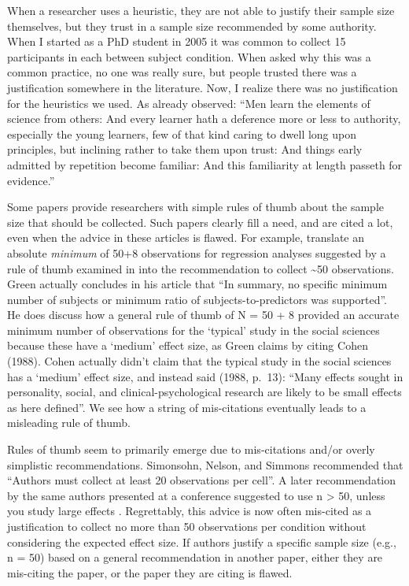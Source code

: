 \documentclass[
  oneside]{book}
\begin{document}
When a researcher uses a heuristic, they are not able to justify their sample size themselves, but they trust in a sample size recommended by some authority. When I started as a PhD student in 2005 it was common to collect 15 participants in each between subject condition. When asked why this was a common practice, no one was really sure, but people trusted there was a justification somewhere in the literature. Now, I realize there was no justification for the heuristics we used. As \citet{berkeley_defence_1735} already observed: ``Men learn the elements of science from others: And every learner hath a deference more or less to authority, especially the young learners, few of that kind caring to dwell long upon principles, but inclining rather to take them upon trust: And things early admitted by repetition become familiar: And this familiarity at length passeth for evidence.''

Some papers provide researchers with simple rules of thumb about the sample size that should be collected. Such papers clearly fill a need, and are cited a lot, even when the advice in these articles is flawed. For example, \citet{wilson_vanvoorhis_understanding_2007} translate an absolute \emph{minimum} of 50+8 observations for regression analyses suggested by a rule of thumb examined in \citet{green_how_1991} into the recommendation to collect \textasciitilde50 observations. Green actually concludes in his article that ``In summary, no specific minimum number of subjects or minimum ratio of subjects-to-predictors was supported''. He does discuss how a general rule of thumb of N = 50 + 8 provided an accurate minimum number of observations for the `typical' study in the social sciences because these have a `medium' effect size, as Green claims by citing Cohen (1988). Cohen actually didn't claim that the typical study in the social sciences has a `medium' effect size, and instead said (1988, p.~13): ``Many effects sought in personality, social, and clinical-psychological research are likely to be small effects as here defined''. We see how a string of mis-citations eventually leads to a misleading rule of thumb.

Rules of thumb seem to primarily emerge due to mis-citations and/or overly simplistic recommendations. Simonsohn, Nelson, and Simmons \citeyearpar{simmons_false-positive_2011} recommended that ``Authors must collect at least 20 observations per cell''. A later recommendation by the same authors presented at a conference suggested to use n \textgreater{} 50, unless you study large effects \citep{simmons_life_2013}. Regrettably, this advice is now often mis-cited as a justification to collect no more than 50 observations per condition without considering the expected effect size. If authors justify a specific sample size (e.g., n = 50) based on a general recommendation in another paper, either they are mis-citing the paper, or the paper they are citing is flawed.
\end{document}
